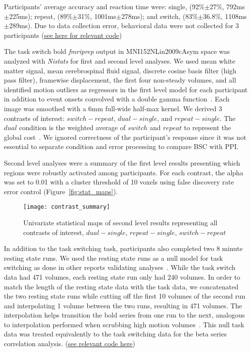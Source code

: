 \documentclass[phd,appendix,figures]{uithesis}
\begin{document}
Participants' average accuracy and reaction time were:
single, (92\%$\pm$27\%, 792ms$\pm$225ms); repeat, (89\%$\pm$31\%, 1001ms$\pm$278ms);
and switch, (83\%$\pm$36.8\%, 1108ms$\pm$289ms).
Due to data collection error, behavioral data were not collected for 3 participants
(\href{https://github.com/jdkent/BetaSeriesRealDataAnalysis/blob/b18b44321edf7b662a1e5ea635f64452c8d3644c/summarizeBehavior/summarize_behavior.ipynb}{see here for relevant code})

The task switch bold \emph{fmriprep} output in MNI152NLin2009cAsym space
was analyzed with \emph{Nistats} for first and second level analyses.
We used mean white matter signal, mean cerebrospinal fluid signal,
discrete cosine basis filter (high pass filter), framewise displacement, the first four non-steady volumes, and
all identified motion outliers as regressors in the first level model for each participant
in addition to event onsets convolved with a double gamma function~\cite{Glover1999}.
Each image was smoothed with a 6mm full-wide half-max kernel.
We derived 3 contrasts of interest: $switch - repeat$, $dual- single$, and $repeat - single$.
The $dual$ condition is the weighted average of $switch$ and $repeat$ to represent the global cost~\cite{Wylie2000}.
We ignored correctness of the participant's response since it was not essential to
separate condition and error processing to compare BSC with PPI.

Second level analyses were a summary of the first level results presenting which
regions were robustly activated among participants.
For each contrast, the alpha was set to 0.01 with a cluster threshold of 10 voxels using
false discovery rate error control (Figure~\ref{fig:stat_maps}).

\begin{figure}[H]
  \centering
  \texttt{[image: contrast\_summary]}
  \caption[Univariate statistical maps]{
    Univariate statistical maps of second level results representing
    all contrasts of interest, $dual - single$, $repeat - single$, $switch - repeat$}
  \label{fig:stat_maps2}
\end{figure}

In addition to the task switching task, participants also completed
two 8 minute resting state runs.
We used the resting state runs as a null model for task switching as done
in other reports validating analyses~\cite{Eklund2016,Olszowy2019}.
While the task switch data had 471 volumes, each resting state run only had
240 volumes.
In order to match the length of the resting state data with the task data, we concatenated
the two resting state runs while cutting off the first 10 volumes of the second run
and interpolating 1 volume between the two runs, resulting in 471 volumes.
The interpolation helps transition the bold series from one run to the next,
analogous to interpolation performed when scrubbing high motion volumes~\cite{Power2014a}. 
This null task data was treated equivalently to the task switching data for the
beta series correlation analysis.
(\href{https://github.com/jdkent/validateBetaSeries/tree/195ad5b4201971038dbbf8f73a3c537caf032743}{see relevant code here})
\end{document}
